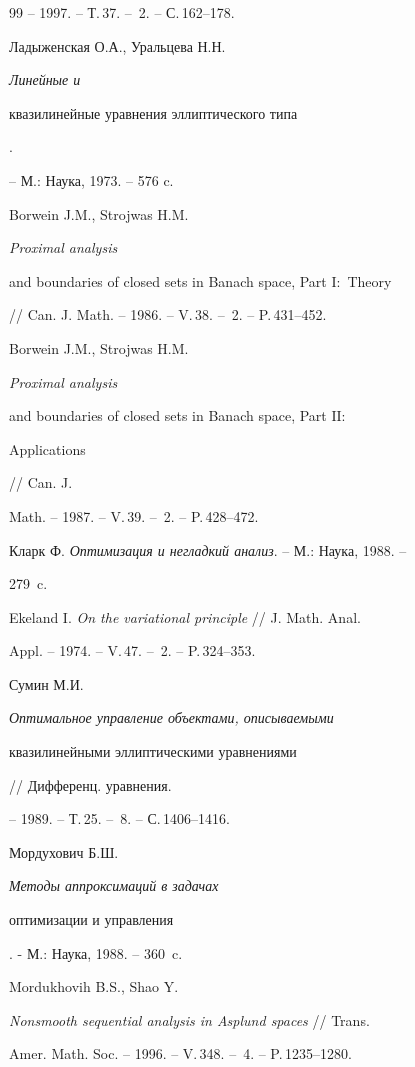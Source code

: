 \begin{thebibliography}{99}
-- 1997. -- Т.\,37. -- \No\,2. -- С.\,162--178.




Ладыженская О.А., Уральцева Н.Н. {\em Линейные и


квазилинейные уравнения эллиптического типа}.


-- М.: Наука, 1973. -- 576 c.




Borwein J.M., Strojwas H.M. {\em Proximal analysis


and boundaries of closed sets in Banach space, Part $\mathrm I:$ Theory}


// Can. J. Math. -- 1986. -- V.\,38. -- \No\,2. -- P.\,431--452.




Borwein J.M., Strojwas H.M. {\em Proximal analysis


and boundaries of closed sets in Banach space, Part $\mathrm{II}:$


Applications} // Can. J.


Math. -- 1987. -- V.\,39. -- \No\,2. -- P.\,428--472.







Кларк Ф. {\em Оптимизация и негладкий анализ}. -- М.: Наука, 1988. --


279~c.







Ekeland I. {\em On the variational principle} // J. Math. Anal.


Appl. -- 1974. -- V.\,47. -- \No\,2. -- P.\,324--353.







Сумин М.И. {\em Оптимальное управление объектами, описываемыми


квазилинейными эллиптическими уравнениями} // Дифференц. уравнения.


-- 1989. -- Т.\,25. -- \No\,8. -- С.\,1406--1416.







Мордухович Б.Ш. {\em Методы аппроксимаций в задачах


оптимизации и управления}. - М.: Наука, 1988. -- 360~c.







Mordukhovih B.S., Shao Y.


{\em Nonsmooth sequential analysis in Asplund spaces} // Trans.


Amer. Math. Soc. -- 1996. -- V.\,348. -- \No\,4. -- P.\,1235--1280.





\end{thebibliography} 


